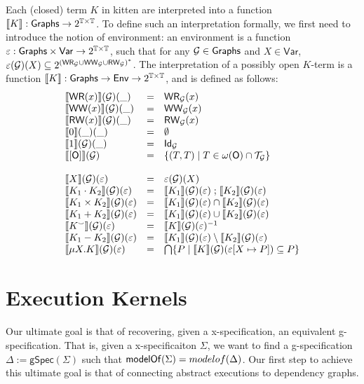 \documentclass[a4paper,UKenglish]{article}%
\theoremstyle{plain}
\newcommand{\gspec}{\ensuremath{\mathsf{gSpec}}}
\begin{document}
Each (closed) term $K$ in kitten are interpreted into a function ${\llbracket K \rrbracket} : \mathsf{Graphs} \rightarrow 2^{\mathbb{T} \times \mathbb{T}}$. 
To define such an interpretation formally, we first need to introduce the notion of environment: an environment is a 
function $\varepsilon: \mathsf{Graphs} \times \mathsf{Var} \rightarrow 2^{\mathbb{T} \times \mathbb{T}}$, such that 
for any $\mathcal{G} \in \mathsf{Graphs}$ and $X \in \mathsf{Var}$, $\varepsilon(\mathcal{G})(X) \subseteq 2^{({\mathsf{WR}}_{\mathcal{G}} \cup {\mathsf{WW}}_{\mathcal{G}} \cup {\mathsf{RW}}_{\mathcal{G}})^{\ast}}$. 
The interpretation of a possibly open $K$-term is a function ${\llbracket K \rrbracket} : \mathsf{Graphs} \rightarrow \mathsf{Env} \rightarrow 2^{\mathbb{T} \times \mathbb{T}}$, 
and is defined as follows: 
\[
\begin{array}{lcl}
{\llbracket {\mathsf{WR}}(x) \rrbracket}(\mathcal{G})(\_) &=& {\mathsf{WR}}_{\mathcal{G}}(x)\\
{\llbracket {\mathsf{WW}}(x) \rrbracket}(\mathcal{G})(\_) &=& {\mathsf{WW}}_{\mathcal{G}}(x)\\
{\llbracket {\mathsf{RW}}(x) \rrbracket}(\mathcal{G})(\_) &=& {\mathsf{RW}}_{\mathcal{G}}(x)\\
{\llbracket 0 \rrbracket}(\_)(\_) &=& \emptyset\\
{\llbracket 1 \rrbracket}(\mathcal{G})(\_) &=& \mathsf{Id}_{\mathcal{G}}\\
{\llbracket [\mathsf{O}] \rrbracket}(\mathcal{G}) &=& \{(T,T) \mid T \in \omega(\mathsf{O}) \cap \mathcal{T}_{\mathcal{G}}\}\\
&&\\
{\llbracket X \rrbracket}(\mathcal{G})(\varepsilon) &=& \varepsilon(\mathcal{G})(X)\\
{\llbracket K_1 \cdot K_2 \rrbracket}(\mathcal{G})(\varepsilon) &=& {\llbracket K_1 \rrbracket}(\mathcal{G})(\varepsilon) \mathrel{;} {\llbracket K_2 \rrbracket}(\mathcal{G})(\varepsilon)\\
{\llbracket K_1 \times K_2 \rrbracket}(\mathcal{G})(\varepsilon) &=& {\llbracket K_1 \rrbracket}(\mathcal{G})(\varepsilon) \cap {\llbracket K_2 \rrbracket}(\mathcal{G})(\varepsilon)\\
{\llbracket K_1 + K_2 \rrbracket}(\mathcal{G})(\varepsilon) &=& {\llbracket K_1 \rrbracket}(\mathcal{G})(\varepsilon) \cup {\llbracket K_2 \rrbracket}(\mathcal{G})(\varepsilon)\\
{\llbracket K^{\smallsmile} \rrbracket}(\mathcal{G})(\varepsilon) &=& {\llbracket K \rrbracket}(\mathcal{G})(\varepsilon)^{-1}\\
{\llbracket K_1 - K_2 \rrbracket}(\mathcal{G})(\varepsilon) &=& {\llbracket K_1 \rrbracket}(\mathcal{G})(\varepsilon) \setminus {\llbracket K_2 \rrbracket}(\mathcal{G})(\varepsilon)\\
{\llbracket \mu X. K \rrbracket}(\mathcal{G})(\varepsilon) &=& \bigcap \{ P \mid {\llbracket K \rrbracket}(\mathcal{G})(\varepsilon[X \mapsto P]) \subseteq P\}\\
\end{array}
\]

\section{Execution Kernels}
Our ultimate goal is that of recovering, given a x-specification, an equivalent g-specification. 
That is, given a x-specificaiton $\Sigma$, we want to find a g-specification $\Delta := \gspec(\Sigma)$ 
such that $\mathsf{modelOf}(\Sigma) = modelof(\Delta)$. Our first step to achieve this ultimate goal is 
that of connecting abstract executions to dependency graphs.
 
\end{document}
